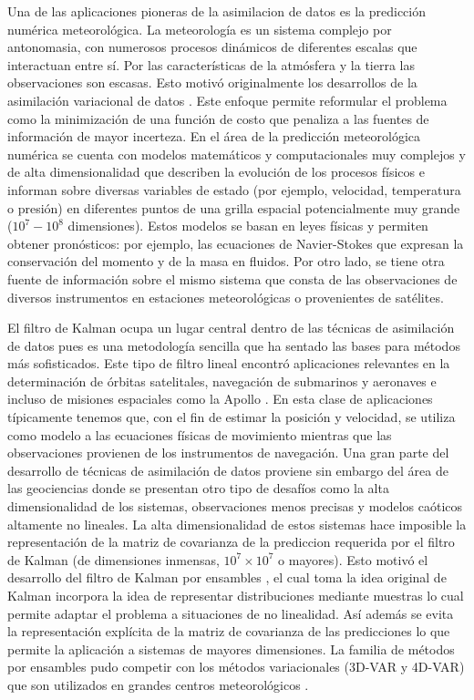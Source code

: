 Una de las aplicaciones pioneras de la asimilacion de datos es la predicción numérica meteorológica. La meteorología es un sistema complejo por antonomasia, con numerosos procesos dinámicos de diferentes escalas que interactuan entre sí. Por las características de la atmósfera y la tierra las observaciones son escasas. Esto motivó originalmente los desarrollos de la asimilación variacional de datos \citep{Talagrand1987}. Este enfoque permite reformular el problema como la minimización de una función de costo que penaliza a las fuentes de información de mayor incerteza. En el área de la predicción meteorológica numérica se cuenta con modelos matemáticos y computacionales muy complejos y de alta dimensionalidad que describen la evolución de los procesos físicos e informan sobre diversas variables de estado (por ejemplo, velocidad, temperatura o presión) en diferentes puntos de una grilla espacial potencialmente muy grande ($10^7 - 10^8$ dimensiones). Estos modelos se basan en leyes físicas y permiten obtener pronósticos: por ejemplo, las ecuaciones de Navier-Stokes que expresan la conservación del momento y de la masa en fluidos. Por otro lado, se tiene otra fuente de información sobre el mismo sistema que consta de las observaciones de diversos instrumentos en estaciones meteorológicas o provenientes de satélites. 

El filtro de Kalman \citep{Kalman1960, Kalman1961} ocupa un lugar central dentro de las técnicas de asimilación de datos pues es una metodología sencilla que ha sentado las bases para métodos más sofisticados. Este tipo de filtro lineal encontró aplicaciones relevantes en la determinación de órbitas satelitales, navegación de submarinos y aeronaves e incluso de misiones espaciales como la Apollo \citep{Jazwinski1970}. En esta clase de aplicaciones típicamente tenemos que, con el fin de estimar la posición y velocidad, se utiliza como modelo a las ecuaciones físicas de movimiento mientras que las observaciones provienen de los instrumentos de navegación. Una gran parte del desarrollo de técnicas de asimilación de datos proviene sin embargo del área de las geociencias donde se presentan otro tipo de desafíos como la alta dimensionalidad de los sistemas, observaciones menos precisas y modelos caóticos altamente no lineales. La alta dimensionalidad de estos sistemas hace imposible la representación de la matriz de covarianza de la prediccion requerida por el filtro de Kalman (de dimensiones inmensas, $10^7 \times 10^7$ o mayores). Esto motivó el desarrollo del filtro de Kalman por ensambles \citep{Evensen1994}, el cual toma la idea original de Kalman incorpora la idea de representar distribuciones mediante muestras lo cual permite adaptar el problema a situaciones de no linealidad. Así además se evita la representación explícita de la matriz de covarianza de las predicciones lo que permite la aplicación a sistemas de mayores dimensiones. La familia de métodos por ensambles pudo competir con los métodos variacionales (3D-VAR y 4D-VAR) que son utilizados en grandes centros meteorológicos \citep{Kalnay2007}.

